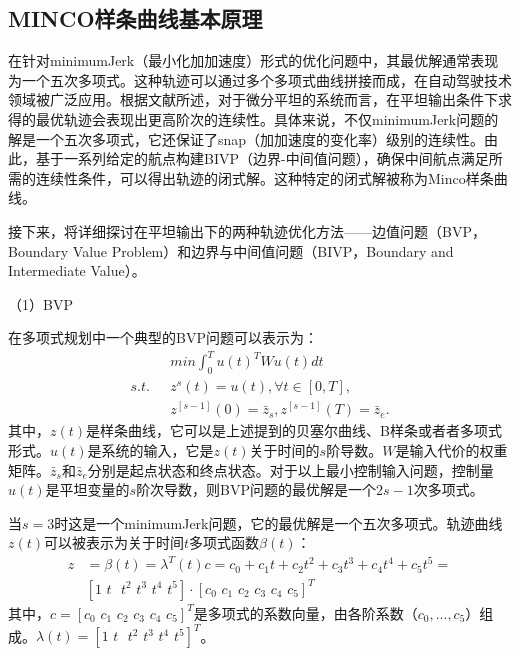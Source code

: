 \documentclass[master,academic]{ysuthesis} %
\begin{document}
		\subsection{MINCO样条曲线基本原理}
		在针对minimumJerk（最小化加加速度）形式的优化问题中，其最优解通常表现为一个五次多项式。这种轨迹可以通过多个多项式曲线拼接而成，在自动驾驶技术领域被广泛应用。根据文献\cite{wang2022geometrically}所述，对于微分平坦的系统而言，在平坦输出条件下求得的最优轨迹会表现出更高阶次的连续性。具体来说，不仅minimumJerk问题的解是一个五次多项式，它还保证了snap（加加速度的变化率）级别的连续性。由此，基于一系列给定的航点构建BIVP（边界-中间值问题），确保中间航点满足所需的连续性条件，可以得出轨迹的闭式解。这种特定的闭式解被称为Minco样条曲线。

		接下来，将详细探讨在平坦输出下的两种轨迹优化方法——边值问题（BVP，Boundary Value Problem）和边界与中间值问题（BIVP，Boundary and Intermediate Value）。

		（1）BVP

		在多项式规划中一个典型的BVP问题可以表示为：
		\begin{equation}
			\begin{aligned}
				&min\int_0^T{u}(t) ^TWu(t) dt\\
				s.t. \ \ \ &z^s(t) =u(t) ,\forall t\in \left[ 0,T \right] ,\\
				&z^{\left[ s-1 \right]}(0) =\bar{z}_s,z^{\left[ s-1 \right]}(T) =\bar{z}_e.
			\end{aligned}
		\end{equation}
		其中，$z(t)$是样条曲线，它可以是上述提到的贝塞尔曲线、B样条或者者多项式形式。$u(t)$是系统的输入，它是$z(t)$关于时间的$s$阶导数。$W$是输入代价的权重矩阵。$\bar{z}_s$和$\bar{z}_e$分别是起点状态和终点状态。对于以上最小控制输入问题，控制量$u(t)$是平坦变量的$s$阶次导数，则BVP问题的最优解是一个$2s-1$次多项式。

		当$s=3$时这是一个minimumJerk问题，它的最优解是一个五次多项式。轨迹曲线$z(t)$可以被表示为关于时间$t$多项式函数$\beta(t)$：
		\begin{equation}
			\begin{aligned}
				z&=\beta (t) =\lambda ^T(t) c=c_0+c_1t+c_2t^2+c_3t^3+c_4t^4+c_5t^5=\\
				&\left[ 1\,\,t\,\,\,\,t^2\,\,t^3\,\,t^4\,\,t^5 \right] \cdot \left[ c_0\,\,c_1\,\,c_2\,\,c_3\,\,c_4\,\,c_5 \right] ^T
			\end{aligned}
		\end{equation}
		其中，$c=\left[ c_0\,\,c_1\,\,c_2\,\,c_3\,\,c_4\,\,c_5 \right] ^T$是多项式的系数向量，由各阶系数（$c_0,...,c_5$）组成。$\lambda(t)=\left[ 1\,\,t\,\,\,\,t^2\,\,t^3\,\,t^4\,\,t^5 \right]^T$。
		
\end{document}

